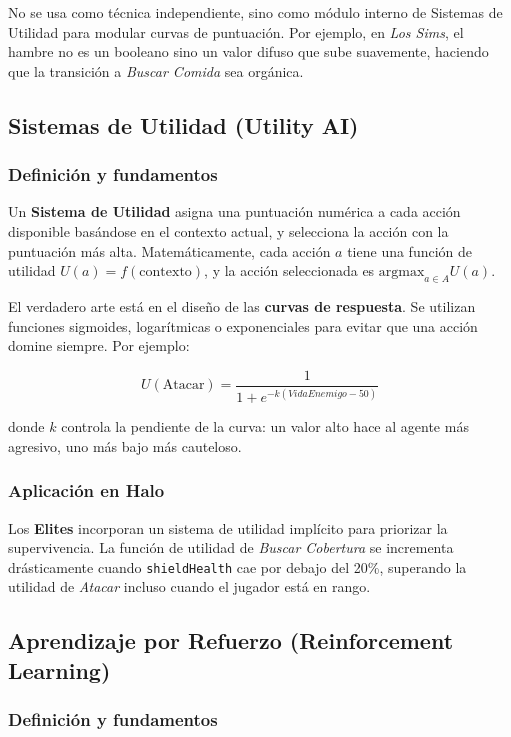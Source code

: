 \documentclass[12pt,letterpaper]{article}
\begin{document}
No se usa como técnica independiente, sino como módulo interno de Sistemas de Utilidad para modular curvas de puntuación. Por ejemplo, en \textit{Los Sims}, el hambre no es un booleano sino un valor difuso que sube suavemente, haciendo que la transición a \textit{Buscar Comida} sea orgánica.

\subsection{Sistemas de Utilidad (Utility AI)}

\subsubsection{Definición y fundamentos}

Un \textbf{Sistema de Utilidad} asigna una puntuación numérica a cada acción disponible basándose en el contexto actual, y selecciona la acción con la puntuación más alta. Matemáticamente, cada acción \(a\) tiene una función de utilidad \(U(a) = f(\text{contexto})\), y la acción seleccionada es \(\text{argmax}_{a \in A} U(a)\).

El verdadero arte está en el diseño de las \textbf{curvas de respuesta}. Se utilizan funciones sigmoides, logarítmicas o exponenciales para evitar que una acción domine siempre. Por ejemplo:

\[
U(\text{Atacar}) = \frac{1}{1 + e^{-k(VidaEnemigo - 50)}}
\]

donde \(k\) controla la pendiente de la curva: un valor alto hace al agente más agresivo, uno más bajo más cauteloso.

\subsubsection{Aplicación en Halo}

Los \textbf{Elites} incorporan un sistema de utilidad implícito para priorizar la supervivencia. La función de utilidad de \textit{Buscar Cobertura} se incrementa drásticamente cuando \texttt{shieldHealth} cae por debajo del 20\%, superando la utilidad de \textit{Atacar} incluso cuando el jugador está en rango.

\subsection{Aprendizaje por Refuerzo (Reinforcement Learning)}

\subsubsection{Definición y fundamentos}
\end{document}

